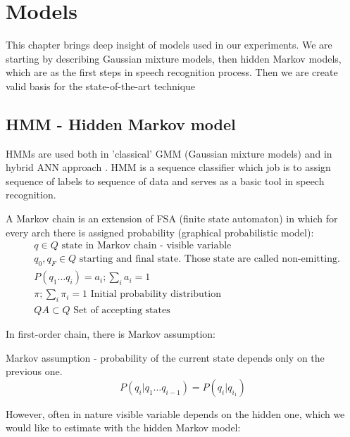 \chapter{Models}
This chapter brings deep insight of models used in our experiments. We are starting by describing Gaussian mixture models, then hidden Markov models, which are as the first steps in speech recognition process. Then we are create valid basis for the state-of-the-art technique \parencite{mohamed_phone_2010}


\section{HMM - Hidden Markov model}

HMMs are used both in 'classical' GMM (Gaussian mixture models) and in hybrid ANN approach \parencite{jurafsky}. HMM is a sequence classifier which job is to assign sequence of labels to sequence of data and serves as a basic tool in speech recognition.

\begin{definition} A Markov chain is an extension of FSA (finite state automaton) in which for every arch there is assigned probability (graphical probabilistic model):
	\begin{align}
		& q \in Q \text{ state in Markov chain - visible variable} \\
		& q_0,q_F \in Q \text{ starting and final state. Those state are called non-emitting.} \\
		& P(q_1 \ldots q_{i})=a_i; \sum\limits_{i}a_i=1\\
		& \pi; \sum\limits_{i} \pi_i=1 \text{ Initial probability distribution} \\
		& QA \subset Q \text{ Set of accepting states } 
	\end{align}
\end{definition}

In first-order chain, there is Markov assumption:
\begin{definition} Markov assumption - probability of the current state depends only on the previous one.
	\begin{equation}
		P(q_i|q_1\ldots q_{i-1})=P(q_i|q_{i_1})
	\end{equation}
\end{definition}
However, often in nature visible variable depends on the hidden one, which we would like to estimate with the hidden Markov model:

